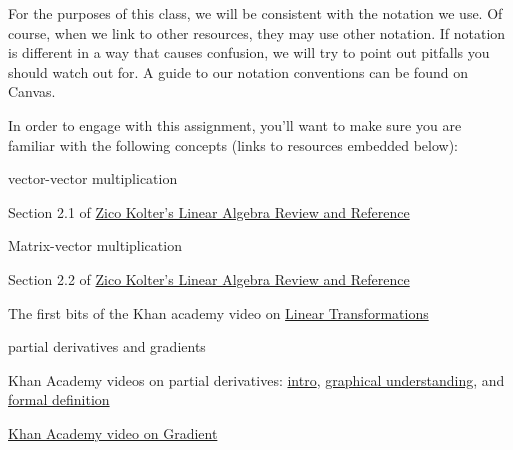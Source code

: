 \documentclass{tufte-handout}
\begin{document}
\begin{notice}
For the purposes of this class, we will be consistent with the notation we use.  Of course, when we link to other resources, they may use other notation.  If notation is different in a way that causes confusion, we will try to point out pitfalls you should watch out for.  A guide to our notation conventions can be found on Canvas.
\end{notice}

\begin{recall}
In order to engage with this assignment, you'll want to make sure you are familiar with the following concepts (links to resources embedded below):
\bi
\item vector-vector multiplication
\bi
\item Section 2.1 of \href{https://see.stanford.edu/materials/aimlcs229/cs229-linalg.pdf}{Zico Kolter's Linear Algebra Review and Reference}
\ei
\item Matrix-vector multiplication
\bi
\item Section 2.2 of \href{https://see.stanford.edu/materials/aimlcs229/cs229-linalg.pdf}{Zico Kolter's Linear Algebra Review and Reference}
\item The first bits of the Khan academy video on \href{https://www.khanacademy.org/math/linear-algebra/matrix-transformations/linear-transformations/v/matrix-vector-products-as-linear-transformations}{Linear Transformations}
\ei
\item partial derivatives and gradients
\bi
\item Khan Academy videos on partial derivatives: \href{https://www.khanacademy.org/math/multivariable-calculus/multivariable-derivatives/partial-derivatives/v/partial-derivatives-introduction}{intro}, \href{https://www.khanacademy.org/math/multivariable-calculus/multivariable-derivatives/partial-derivatives/v/partial-derivatives-and-graphs}{graphical understanding}, and \href{https://www.khanacademy.org/math/multivariable-calculus/multivariable-derivatives/partial-derivatives/v/formal-definition-of-partial-derivatives}{formal definition}
\item \href{https://www.khanacademy.org/math/multivariable-calculus/multivariable-derivatives/gradient-and-directional-derivatives/v/gradient}{Khan Academy video on Gradient}
\ei
\ei
\end{recall}
\end{document}
